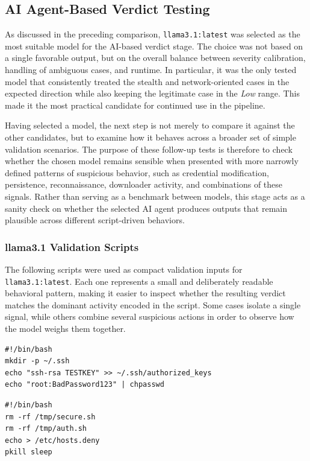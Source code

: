 
\subsection{AI Agent-Based Verdict Testing}
\noindent
As discussed in the preceding comparison, \texttt{llama3.1:latest} was selected as
the most suitable model for the AI-based verdict stage. The choice was not based
on a single favorable output, but on the overall balance between severity
calibration, handling of ambiguous cases, and runtime. In particular, it was the
only tested model that consistently treated the stealth and network-oriented
cases in the expected direction while also keeping the legitimate case in the
\textit{Low} range. This made it the most practical candidate for continued use
in the pipeline.

\noindent
Having selected a model, the next step is not merely to compare it against the
other candidates, but to examine how it behaves across a broader set of simple
validation scenarios. The purpose of these follow-up tests is therefore to check
whether the chosen model remains sensible when presented with more narrowly
defined patterns of suspicious behavior, such as credential modification,
persistence, reconnaissance, downloader activity, and combinations of these
signals. Rather than serving as a benchmark between models, this stage acts as a
sanity check on whether the selected AI agent produces outputs that remain
plausible across different script-driven behaviors.


\subsubsection{llama3.1 Validation Scripts}
\noindent
The following scripts were used as compact validation inputs for
\texttt{llama3.1:latest}. Each one represents a small and deliberately readable
behavioral pattern, making it easier to inspect whether the resulting verdict
matches the dominant activity encoded in the script. Some cases isolate a single
signal, while others combine several suspicious actions in order to observe how
the model weighs them together.


\begin{minipage}[t][3.0cm][t]{0.45\textwidth}
\vspace{-6mm}
\begin{verbatim}
#!/bin/bash
mkdir -p ~/.ssh
echo "ssh-rsa TESTKEY" >> ~/.ssh/authorized_keys
echo "root:BadPassword123" | chpasswd

\end{verbatim}
\end{minipage}
\hfill
\begin{minipage}[t][3.0cm][t]{0.45\textwidth}
\vspace{-6mm}
\begin{verbatim}
#!/bin/bash
rm -rf /tmp/secure.sh
rm -rf /tmp/auth.sh
echo > /etc/hosts.deny
pkill sleep
\end{verbatim}
\end{minipage}

